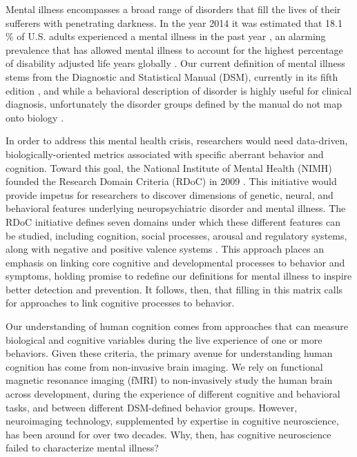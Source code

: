 \documentclass{report}
\begin{document}

Mental illness encompasses a broad range of disorders that fill the lives of their sufferers with penetrating darkness. In the year 2014 it was estimated that 18.1 \% of U.S. adults experienced a mental illness in the past year \cite{Samhsa_undated-fo}, an alarming prevalence that has allowed mental illness to account for the highest percentage of disability adjusted life years globally \cite{noauthor_2010-wr}. Our current definition of mental illness stems from the Diagnostic and Statistical Manual (DSM), currently in its fifth edition \cite{american2013diagnostic}, and while a behavioral description of disorder is highly useful for clinical diagnosis, unfortunately the disorder groups defined by the manual do not map onto biology \cite{Cuthbert2013-ks}.

In order to address this mental health crisis, researchers would need data-driven, biologically-oriented metrics associated with specific aberrant behavior and cognition. Toward this goal, the National Institute of Mental Health (NIMH) founded the Research Domain Criteria (RDoC) in 2009 \cite{Insel2009-vi}. This initiative would provide impetus for researchers to discover dimensions of genetic, neural, and behavioral features underlying neuropsychiatric disorder and mental illness. The RDoC initiative defines seven domains under which these different features can be studied, including cognition, social processes, arousal and regulatory systems, along with negative and positive valence systems \cite{Morris2012-hx}. This approach places an emphasis on linking core cognitive and developmental processes to behavior and symptoms, holding promise to redefine our definitions for mental illness to inspire better detection and prevention. It follows, then, that filling in this matrix calls for approaches to link cognitive processes to behavior.

Our understanding of human cognition comes from approaches that can measure biological and cognitive variables during the live experience of one or more behaviors. Given these criteria, the primary avenue for understanding human cognition has come from non-invasive brain imaging. We rely on functional magnetic resonance imaging (fMRI) to non-invasively study the human brain across development, during the experience of different cognitive and behavioral tasks, and between different DSM-defined behavior groups. However, neuroimaging technology, supplemented by expertise in cognitive neuroscience, has been around for over two decades. Why, then, has cognitive neuroscience failed to characterize mental illness?
\end{document}

